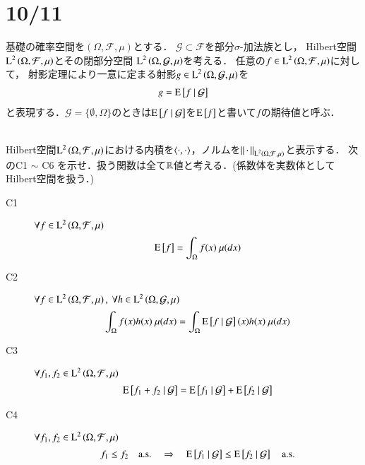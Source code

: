 \section{10/11}
	基礎の確率空間を$(\Omega,\mathcal{F},\mu)$とする．
	$\mathcal{G} \subset \mathcal{F}$を部分$\sigma$-加法族とし，
	Hilbert空間$\operatorname{L}^{2} \left(\Omega,\mathcal{F},\mu\right)$とその閉部分空間
	$\operatorname{L}^{2} \left(\Omega, \mathcal{G},\mu\right)$を考える．
	任意の$f \in \operatorname{L}^{2} \left(\Omega, \mathcal{F},\mu\right)$に対して，
	射影定理により一意に定まる射影$g \in \operatorname{L}^{2} \left(\Omega, \mathcal{G},\mu\right)$を
	\begin{align}
		g = \operatorname{E} \left[ f \ \middle|\ \mathcal{G} \right]
	\end{align}
	と表現する．$\mathcal{G} = \{\emptyset, \Omega\}$のときは$\operatorname{E} \left[ f \ \middle|\ \mathcal{G} \right]$を$\operatorname{E} \left[ f \right]$と書いて$f$の期待値と呼ぶ．
	\begin{qst}\mbox{}\\
		Hilbert空間$\operatorname{L}^{2} \left(\Omega, \mathcal{F},\mu\right)$における内積を$\inprod<\cdot,\cdot>$，ノルムを$\left\|\, \cdot\, \right\|_{\operatorname{L}^{2} \left(\Omega, \mathcal{F},\mu\right)}$と表示する．
		次のC1 $\sim$ C6 を示せ．扱う関数は全て$\mathbb{R}$値と考える．(係数体を実数体としてHilbert空間を扱う．)
		\begin{description}
			\item[C1] $\forall f \in \operatorname{L}^{2} \left(\Omega, \mathcal{F},\mu\right)$
				\begin{align}
					\operatorname{E} \left[ f \right] = \int_{\Omega} f(x)\ \mu(dx)
				\end{align}
				
			\item[C2]	$\forall f \in \operatorname{L}^{2} \left(\Omega, \mathcal{F},\mu\right),\ \forall h \in \operatorname{L}^{2} \left(\Omega, \mathcal{G},\mu\right)$
				\begin{align}
					\int_{\Omega} f(x)h(x)\ \mu(dx) = \int_{\Omega} \operatorname{E} \left[ f \ \middle|\ \mathcal{G} \right](x)h(x)\ \mu(dx)
				\end{align}
				
			\item[C3]	$\forall f_1,f_2 \in \operatorname{L}^{2} \left(\Omega, \mathcal{F},\mu\right)$
				\begin{align}
					\operatorname{E} \left[ f_1 + f_2 \ \middle|\ \mathcal{G} \right] = \operatorname{E} \left[ f_1 \ \middle|\ \mathcal{G} \right] + \operatorname{E} \left[ f_2 \ \middle|\ \mathcal{G} \right]
				\end{align}

			\item[C4]	$\forall f_1,f_2 \in \operatorname{L}^{2} \left(\Omega, \mathcal{F},\mu\right)$
				\begin{align}
					f_1 \leq f_2 \quad \mathrm{a.s.} \quad \Rightarrow \quad \operatorname{E} \left[ f_1 \ \middle|\ \mathcal{G} \right] \leq \operatorname{E} \left[ f_2 \ \middle|\ \mathcal{G} \right] \quad \mathrm{a.s.}
				\end{align}
			

\end{description}
\end{qst}
